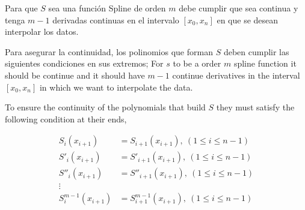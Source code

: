 \begin{paracol}{2}
Para que $S$ sea una función Spline de orden $m$ debe cumplir que sea continua y tenga $m-1$ derivadas continuas en el intervalo $[x_0,x_n]$ en que se desean interpolar los datos.
   
Para asegurar la continuidad, los polinomios que forman $S$ deben cumplir las siguientes condiciones en sus extremos;
\switchcolumn
For $s$ to be a order $m$ spline function it should be continue and it should have $m-1$ continue derivatives in the interval $[x_0,x_n]$ in which we want to interpolate the data.

To ensure the continuity of the polynomials that build $S$ they must satisfy the following condition at their ends, 
\end{paracol}
\begin{align*}
S_i(x_{i+1})&=S_{i+1}(x_{i+1}),\ (1\leq i \leq n-1)\\
S'_i(x_{i+1})&=S'_{i+1}(x_{i+1}),\ (1\leq i \leq n-1)\\
S''_i(x_{i+1})&=S''_{i+1}(x_{i+1}),\ (1\leq i \leq n-1)\\
\vdots \\
S^{m-1}_i(x_{i+1})&=S^{m-1}_{i+1}(x_{i+1}),\ (1\leq i \leq n-1)\\
\end{align*}
